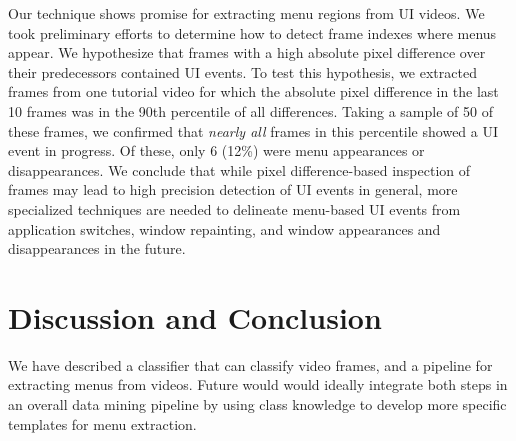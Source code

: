 \documentclass[10pt]{article}
\begin{document}
Our technique shows promise for extracting menu regions from UI videos.  We took preliminary efforts
to determine how to detect frame indexes where menus appear.  We hypothesize that frames with a 
high absolute pixel difference over their predecessors contained UI events.  To test this hypothesis, 
we extracted frames from one tutorial video for which the absolute pixel difference in the last 10
frames was in the 90th percentile of all differences.  Taking a sample of 50 of these frames, we confirmed that
\emph{nearly all} frames in this percentile showed a UI event in progress.  Of these, only 6 (12\%) 
were menu appearances or disappearances.  We conclude that while pixel difference-based inspection of frames may lead to
high precision detection of UI events in general, more specialized techniques are needed to
delineate menu-based UI events from application switches, window repainting, and window
appearances and disappearances in the future.

\section{Discussion and Conclusion}

We have described a classifier that can classify video frames, and a pipeline for extracting menus
from videos. Future would would ideally integrate both steps in an overall data mining pipeline by
using class knowledge to develop more specific templates for menu extraction.

\printbibliography
\end{document}
